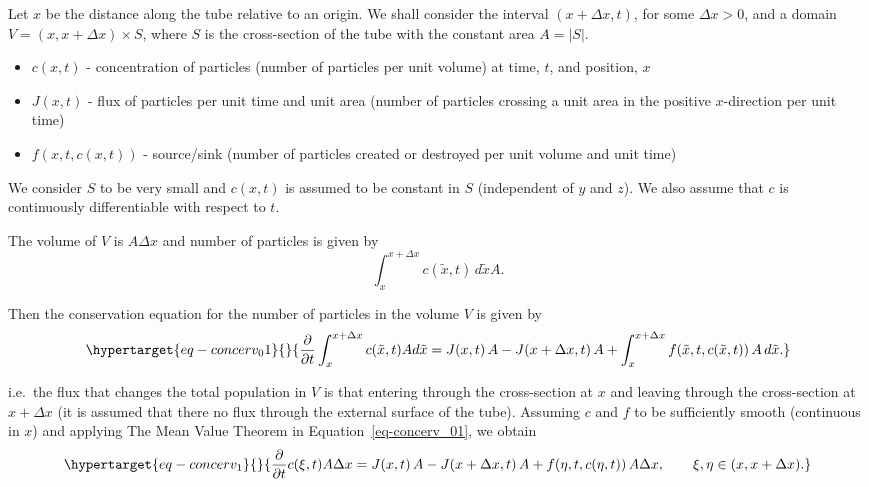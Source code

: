 \documentclass[
  letterpaper,
  DIV=11,
  numbers=noendperiod]{scrreprt}
\theoremstyle{definition}
\theoremstyle{plain}
\theoremstyle{plain}
\theoremstyle{remark}
\begin{document}
Let \(x\) be the distance along the tube relative to an origin. We shall
consider the interval \((x+\Delta x, t)\), for some \(\Delta x >0\), and
a domain \(V= (x, x+ \Delta x) \times S\), where \(S\) is the
cross-section of the tube with the constant area \(A=|S|\).

\begin{itemize}
\item
  \(c(x,t)\) - concentration of particles (number of particles per unit
  volume) at time, \(t\), and position, \(x\)
\item
  \(J(x,t)\) - flux of particles per unit time and unit area (number of
  particles crossing a unit area in the positive \(x\)-direction per
  unit time)
\item
  \(f(x,t ,c(x,t))\) - source/sink (number of particles created or
  destroyed per unit volume and unit time)
\end{itemize}

We consider \(S\) to be very small and \(c(x,t)\) is assumed to be
constant in \(S\) (independent of \(y\) and \(z\)). We also assume that
\(c\) is continuously differentiable with respect to \(t\).

The volume of \(V\) is \(A \Delta x\) and number of particles is given
by \[
\int_x^{x+\Delta x} c(\tilde x, t) \,  d \tilde x A.
\]

Then the conservation equation for the number of particles in the volume
\(V\) is given by \begin{equation}\protect\hypertarget{eq-concerv_01}{}{
\frac{\partial}{\partial t} \int_x^{x+\Delta x} c(\tilde x, t) A d\tilde x = J(x,t) \, A  - J(x+\Delta x,t) \, A +\int_x^{x + \Delta x}  f(\tilde x, t, c(\tilde x, t))\,  A \, d \tilde x.
}\label{eq-concerv_01}\end{equation}

i.e.~the flux that changes the total population in \(V\) is that
entering through the cross-section at \(x\) and leaving through the
cross-section at \(x+\Delta x\) (it is assumed that there no flux
through the external surface of the tube). Assuming \(c\) and \(f\) to
be sufficiently smooth (continuous in \(x\)) and applying The Mean Value
Theorem in Equation~\ref{eq-concerv_01}, we obtain
\begin{equation}\protect\hypertarget{eq-concerv_1}{}{
\frac{\partial}{\partial t} c(\xi, t) A \Delta x = J(x,t) \, A  - J(x+\Delta x,t) \, A +  f(\eta,t,c(\eta, t))\,  A \Delta x, \qquad \xi, \eta \in (x, x+ \Delta x).
}\label{eq-concerv_1}\end{equation}
\end{document}
